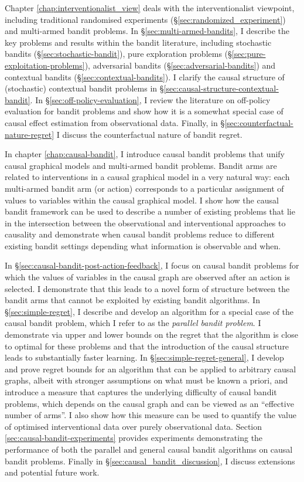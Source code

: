 \documentclass[11pt,a4paper,twoside]{report}
\newcommand{\quotes}[1]{``#1''}
\theoremstyle{plain}
\theoremstyle{definition}
\begin{document}
Chapter \ref{chap:interventionalist_view} deals with the interventionalist viewpoint, including traditional randomised experiments (\S\ref{sec:randomized_experiment}) and multi-armed bandit problems. In \S\ref{sec:multi-armed-bandits}, I describe the key problems and results within the bandit literature, including stochastic bandits (\S\ref{sec:stochastic-bandit}), pure exploration problems (\S\ref{sec:pure-exploitation-problems}), adversarial bandits (\S\ref{sec:adversarial-bandits}) and contextual bandits (\S\ref{sec:contextual-bandits}). I clarify the causal structure of (stochastic) contextual bandit problems in \S\ref{sec:causal-structure-contextual-bandit}. In \S\ref{sec:off-policy-evaluation}, I review the literature on off-policy evaluation for bandit problems and show how it is a somewhat special case of causal effect estimation from observational data. Finally, in \S\ref{sec:counterfactual-nature-regret} I discuss the counterfactual nature of bandit regret. 

In chapter \ref{chap:causal-bandit}, I introduce causal bandit problems that unify causal graphical models and multi-armed bandit problems. Bandit arms are related to interventions in a causal graphical model in a very natural way: each multi-armed bandit arm (or action) corresponds to a particular assignment of values to variables within the causal graphical model. I show how the causal bandit framework can be used to describe a number of existing problems that lie in the intersection between the observational and interventional approaches to causality and demonstrate when causal bandit problems reduce to different existing bandit settings depending what information is observable and when.


In \S\ref{sec:causal-bandit-post-action-feedback}, I focus on causal bandit problems for which the values of variables in the causal graph are observed after an action is selected. I demonstrate that this leads to a novel form of structure between the bandit arms that cannot be exploited by existing bandit algorithms. In \S\ref{sec:simple-regret}, I describe and develop an algorithm for a special case of the causal bandit problem, which I refer to as the \emph{parallel bandit problem}. I demonstrate via upper and lower bounds on the regret that the algorithm is close to optimal for these problems and that the introduction of the causal structure leads to substantially faster learning. In \S\ref{sec:simple-regret-general}, I develop and prove regret bounds for an algorithm that can be applied to arbitrary causal graphs, albeit with stronger assumptions on what must be known a priori, and introduce a measure that captures the underlying difficulty of causal bandit problems, which depends on the causal graph and can be viewed as an \quotes{effective number of arms}. I also show how this measure can be used to quantify the value of optimised interventional data over purely observational data. Section \ref{sec:causal-bandit-experiments} provides experiments demonstrating the performance of both the parallel and general causal bandit algorithms on causal bandit problems. Finally in \S\ref{sec:causal_bandit_discussion}, I discuss extensions and potential future work. 
\end{document}
